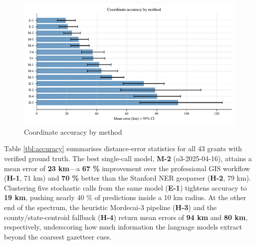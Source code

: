 \begin{figure}
\centering
\includegraphics[width=\textwidth,height=0.8\textheight,keepaspectratio]{figures/accuracy_bar.pdf}
\caption{Coordinate accuracy by method}\label{fig:accuracy_bar}
\end{figure}

Table \ref{tbl:accuracy} summarises distance‐error statistics for all 43
grants with verified ground truth. The best single-call model,
\textbf{M-2} (o3-2025-04-16), attains a mean error of \textbf{23 km}---a
\textbf{67 \%} improvement over the professional GIS workflow
(\textbf{H-1}, 71 km) and \textbf{70 \%} better than the Stanford NER
geoparser (\textbf{H-2}, 79 km). Clustering five stochastic calls from
the same model (\textbf{E-1}) tightens accuracy to \textbf{19 km},
pushing nearly 40 \% of predictions inside a 10 km radius. At the other
end of the spectrum, the heuristic Mordecai-3 pipeline (\textbf{H-3})
and the county/state-centroid fallback (\textbf{H-4}) return mean errors
of \textbf{94 km} and \textbf{80 km}, respectively, underscoring how
much information the language models extract beyond the coarsest
gazetteer cues.

